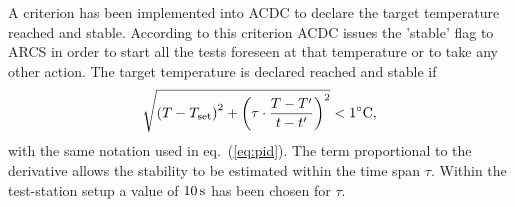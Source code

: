 A criterion has been implemented into ACDC to declare the target temperature reached and stable. According to this criterion ACDC issues the 'stable' flag to ARCS in order to start all the tests foreseen at that temperature or to take any other action. The target temperature is declared reached and stable if
\begin{equation}
\sqrt{\left(T-T_{\rm set} \right)^2 + \left( \tau\cdot\frac{T-T'}{t-t'}\right)^2} < 1^{\circ}{\rm C},
\end{equation}
with the same notation used in eq.~(\ref{eq:pid}). The term proportional to the derivative allows the stability to be estimated within the time span $\tau$. Within the test-station setup a value of $10\rm \, s$ has been chosen for $\tau$.  

